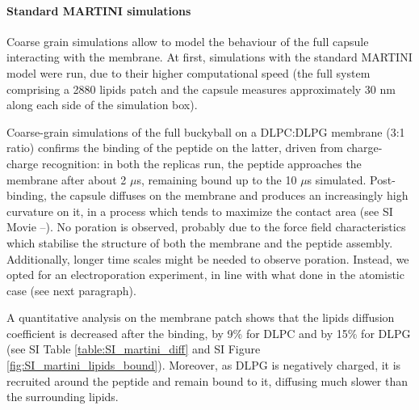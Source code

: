 \paragraph{Standard MARTINI simulations} Coarse grain simulations allow to model the behaviour of the full capsule interacting with the membrane.
%
At first, simulations with the standard MARTINI model were run, due to their higher computational speed (the full system comprising a 2880 lipids patch and the capsule measures approximately 30 nm along each side of the simulation box).

Coarse-grain simulations of the full buckyball on a DLPC:DLPG membrane (3:1 ratio) confirms the binding of the peptide on the latter, driven from charge-charge recognition: in both the replicas run, the peptide approaches the membrane after about 2 $\mu$s, remaining bound up to the 10 $\mu$s simulated.
%
Post-binding, the capsule diffuses on the membrane and produces an increasingly high curvature on it, in a process which tends to maximize the contact area (see SI Movie --). No poration is observed, probably due to the force field characteristics which stabilise the structure of both the membrane and the peptide assembly. Additionally, longer time scales might be needed to observe poration. Instead, we opted for an electroporation experiment, in line with what done in the atomistic case (see next paragraph).

A quantitative analysis on the membrane patch shows that the lipids diffusion coefficient is decreased after the binding, by 9\% for DLPC and by 15\% for DLPG (see SI Table \ref{table:SI_martini_diff} and SI Figure \ref{fig:SI_martini_lipids_bound}).
%
Moreover, as DLPG is negatively charged, it is recruited around the peptide and remain bound to it, diffusing much slower than the surrounding lipids.


